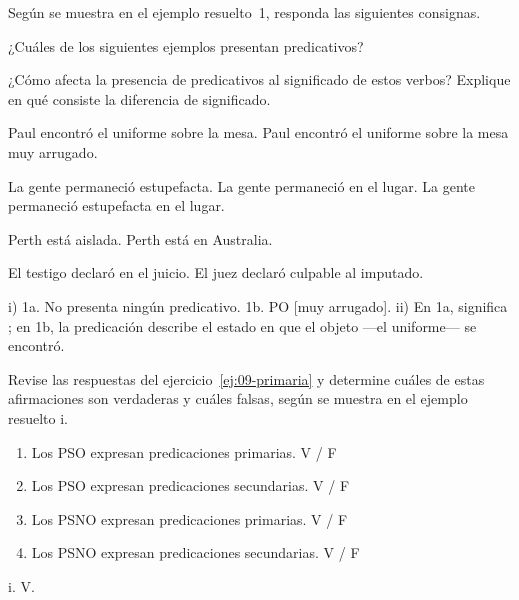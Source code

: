 \begin{ejercicio}\label{ej:09-significado}
Según se muestra en el ejemplo resuelto~1, responda las siguientes consignas.

\begin{consignas}[label=\roman*)]
  \item ¿Cuáles de los siguientes ejemplos presentan predicativos?
  \item ¿Cómo afecta la presencia de predicativos al significado de estos
        verbos? Explique en qué consiste la diferencia de significado.
\end{consignas}

\begin{exe}
  \ex
    \begin{xlist}
      \ex Paul encontró el uniforme sobre la mesa.
      \ex Paul encontró el uniforme sobre la mesa muy arrugado.
    \end{xlist}
  \ex
    \begin{xlist}
      \ex La gente permaneció estupefacta.
      \ex La gente permaneció en el lugar.
      \ex La gente permaneció estupefacta en el lugar.
    \end{xlist}
  \ex
    \begin{xlist}
      \ex Perth está aislada.
      \ex Perth está en Australia.
    \end{xlist}
  \ex
    \begin{xlist}
      \ex El testigo declaró en el juicio.
      \ex El juez declaró culpable al imputado.
    \end{xlist}
\end{exe}

\begin{resuelto}
i) 1a. No presenta ningún predicativo. 1b. PO [muy arrugado]. ii) En 1a,
 significa ; en
1b, la predicación describe el estado en que el objeto ---el uniforme--- se
encontró.
\end{resuelto}
\end{ejercicio}

\begin{ejercicio}\label{ej:09-vf}
Revise las respuestas del ejercicio~\ref{ej:09-primaria} y determine cuáles de
estas afirmaciones son verdaderas y cuáles falsas, según se muestra en el
ejemplo resuelto i.

\begin{enumerate}[label=\roman*.]
  \item Los PSO expresan predicaciones primarias. \hfill V / F
  \item Los PSO expresan predicaciones secundarias. \hfill V / F
  \item Los PSNO expresan predicaciones primarias. \hfill V / F
  \item Los PSNO expresan predicaciones secundarias. \hfill V / F
\end{enumerate}

\begin{resuelto}
i. V.
\end{resuelto}
\end{ejercicio}

